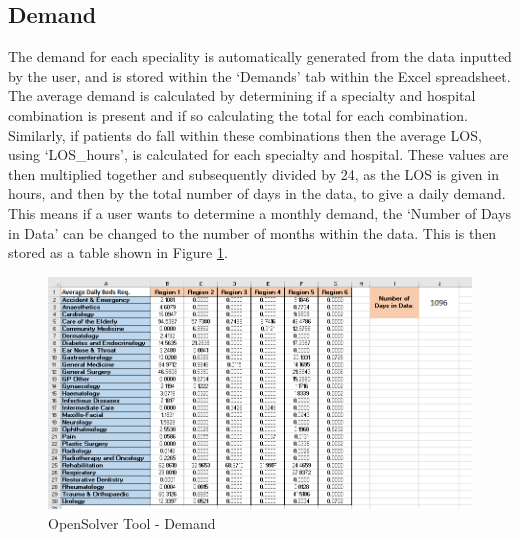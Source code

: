 \documentclass[../thesis.tex]{subfiles}
\begin{document}
\subsection*{Demand}
The demand for each speciality is automatically generated from the data inputted by the user, and is stored within the `Demands' tab within the Excel spreadsheet. The average demand is calculated by determining if a specialty and hospital combination is present and if so calculating the total for each combination. Similarly, if patients do fall within these combinations then the average LOS, using `LOS\_hours', is calculated for each specialty and hospital. These values are then multiplied together and subsequently divided by 24, as the LOS is given in hours, and then by the total number of days in the data, to give a daily demand. This means if a user wants to determine a monthly demand, the `Number of Days in Data' can be changed to the number of months within the data. This is then stored as a table shown in Figure \ref{fig:exdemand}.
\begin{figure}[h!]
    \centering
    \includegraphics[scale=0.8]{Chapters/Chapter7/Figures/Demands.png}
    \caption{OpenSolver Tool - Demand}
    \label{fig:exdemand}
\end{figure}
\end{document}
